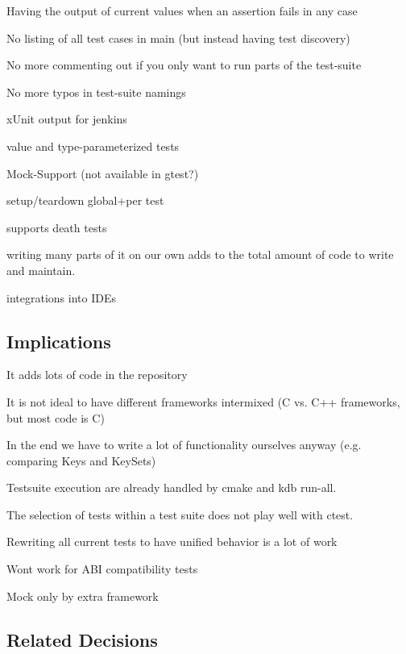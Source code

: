 \begin{DoxyItemize}
\item Having the output of current values when an assertion fails in any case
\item No listing of all test cases in main (but instead having test discovery)
\item No more commenting out if you only want to run parts of the test-\/suite
\item No more typos in test-\/suite namings
\item x\+Unit output for jenkins
\item value and type-\/parameterized tests
\item Mock-\/\+Support (not available in gtest?)
\item setup/teardown global+per test
\item supports death tests
\item writing many parts of it on our own adds to the total amount of code to write and maintain.
\item integrations into I\+D\+Es
\end{DoxyItemize}

\subsection*{Implications}


\begin{DoxyItemize}
\item It adds lots of code in the repository
\item It is not ideal to have different frameworks intermixed (C vs. C++ frameworks, but most code is C)
\item In the end we have to write a lot of functionality ourselves anyway (e.\+g. comparing Keys and Key\+Sets)
\item Testsuite execution are already handled by cmake and kdb run-\/all.
\item The selection of tests within a test suite does not play well with ctest.
\item Rewriting all current tests to have unified behavior is a lot of work
\item Wont work for A\+BI compatibility tests
\item Mock only by extra framework
\end{DoxyItemize}

\subsection*{Related Decisions}


